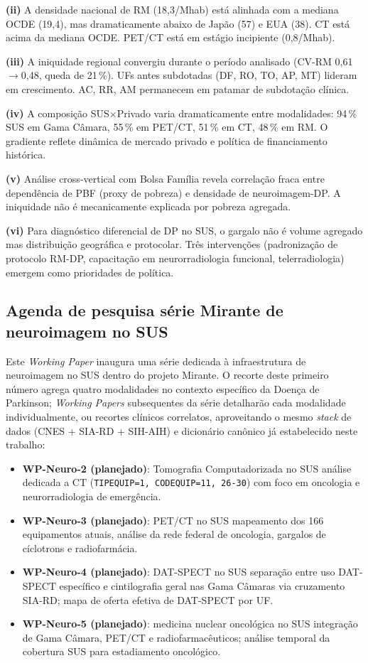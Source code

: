 \documentclass[12pt,a4paper,oneside]{article}
\begin{document}
\textbf{(ii)} A densidade nacional de RM (18,3/Mhab) está alinhada
com a mediana OCDE (19,4), mas dramaticamente abaixo de Japão (57)
e EUA (38). CT está acima da mediana OCDE. PET/CT está em estágio
incipiente (0,8/Mhab).

\textbf{(iii)} A iniquidade regional convergiu durante o período
analisado (CV-RM 0,61$\rightarrow$0,48, queda de 21\,\%). UFs antes
subdotadas (DF, RO, TO, AP, MT) lideram em crescimento. AC, RR, AM
permanecem em patamar de subdotação clínica.

\textbf{(iv)} A composição SUS$\times$Privado varia dramaticamente
entre modalidades: 94\,\% SUS em Gama Câmara, 55\,\% em PET/CT,
51\,\% em CT, 48\,\% em RM. O gradiente reflete dinâmica de mercado
privado e política de financiamento histórica.

\textbf{(v)} Análise cross-vertical com Bolsa Família revela
correlação fraca entre dependência de PBF (proxy de pobreza) e
densidade de neuroimagem-DP. A iniquidade não é mecanicamente
explicada por pobreza agregada.

\textbf{(vi)} Para diagnóstico diferencial de DP no SUS, o gargalo
não é volume agregado mas distribuição geográfica e protocolar. Três
intervenções (padronização de protocolo RM-DP, capacitação em
neurorradiologia funcional, telerradiologia) emergem como
prioridades de política.

\subsection{Agenda de pesquisa \textendash{} série Mirante de neuroimagem no SUS}

Este \textit{Working Paper} inaugura uma série dedicada à
infraestrutura de neuroimagem no SUS dentro do projeto Mirante. O
recorte deste primeiro número agrega quatro modalidades no contexto
específico da Doença de Parkinson; \textit{Working Papers}
subsequentes da série detalharão cada modalidade individualmente,
ou recortes clínicos correlatos, aproveitando o mesmo
\textit{stack} de dados (CNES + SIA-RD + SIH-AIH) e dicionário
canônico já estabelecido neste trabalho:

\begin{itemize}
\item \textbf{WP-Neuro-2 (planejado)}: Tomografia Computadorizada
no SUS \textemdash{} análise dedicada a CT (\texttt{TIPEQUIP=1,
CODEQUIP=11, 26-30}) com foco em oncologia e neurorradiologia de
emergência.
\item \textbf{WP-Neuro-3 (planejado)}: PET/CT no SUS \textemdash{}
mapeamento dos 166 equipamentos atuais, análise da rede federal de
oncologia, gargalos de cíclotrons e radiofarmácia.
\item \textbf{WP-Neuro-4 (planejado)}: DAT-SPECT no SUS
\textemdash{} separação entre uso DAT-SPECT específico e
cintilografia geral nas Gama Câmaras via cruzamento SIA-RD; mapa de
oferta efetiva de DAT-SPECT por UF.
\item \textbf{WP-Neuro-5 (planejado)}: medicina nuclear oncológica
no SUS \textemdash{} integração de Gama Câmara, PET/CT e
radiofarmacêuticos; análise temporal da cobertura SUS para
estadiamento oncológico.
\end{itemize}
\end{document}
